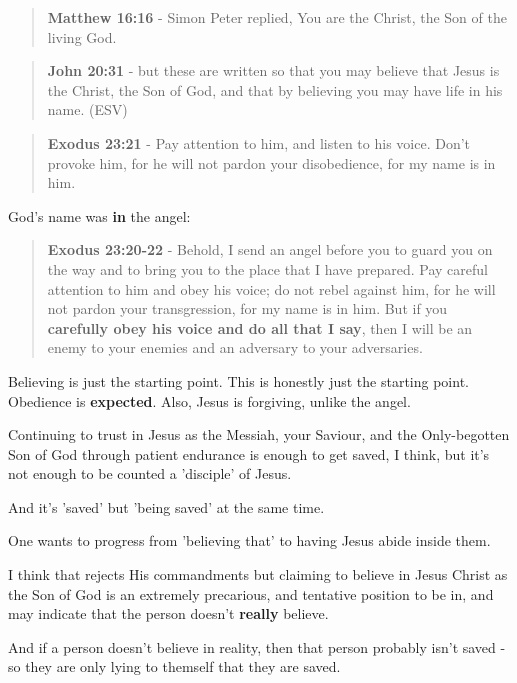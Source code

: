 \documentclass[11pt]{article}
\begin{document}
\begin{quote}
\textbf{Matthew 16:16} - Simon Peter replied, You are the Christ, the Son of the living God.
\end{quote}

\begin{quote}
\textbf{John 20:31} - but these are written so that you may believe that Jesus is the Christ, the Son of God, and that by believing you may have life in his name. (ESV)
\end{quote}

\begin{quote}
\textbf{Exodus 23:21} - Pay attention to him, and listen to his voice. Don't provoke him, for he will not pardon your disobedience, for my name is in him.
\end{quote}

God's name was \textbf{in} the angel:

\begin{quote}
\textbf{Exodus 23:20-22} - Behold, I send an angel before you to guard you on the way and to bring you to the place that I have prepared. Pay careful attention to him and obey his voice; do not rebel against him, for he will not pardon your transgression, for my name is in him. But if you \textbf{carefully obey his voice and do all that I say}, then I will be an enemy to your enemies and an adversary to your adversaries.
\end{quote}

Believing is just the starting point. This is honestly just the starting point. Obedience is \textbf{expected}. Also, Jesus is forgiving, unlike the angel.

Continuing to trust in Jesus as the Messiah, your Saviour, and the Only-begotten Son of God through patient endurance is enough to get saved, I think, but it's not enough to be counted a 'disciple' of Jesus.

And it's 'saved' but 'being saved' at the same time.

One wants to progress from 'believing that' to having Jesus abide inside them.

I think that rejects His commandments but claiming to believe in Jesus Christ as the Son of God is an extremely precarious, and tentative position to be in,
and may indicate that the person doesn't \textbf{really} believe.

And if a person doesn't believe in reality, then that person probably isn't saved - so they are only lying to themself that they are saved.
\end{document}

